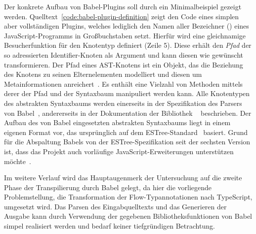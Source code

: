 Der konkrete Aufbau von Babel-Plugins soll durch ein Minimalbeispiel gezeigt werden. Quelltext~\ref{code:babel-plugin-definition} zeigt den Code eines simplen aber vollständigen Plugins, welches lediglich den Namen aller Bezeichner () eines JavaScript-Programms in Großbuchstaben setzt. Hierfür wird eine gleichnamige Besucherfunktion für den Knotentyp  definiert (Zeile 5). Diese erhält den \emph{Pfad} der so adressierten Identifier-Knoten als Argument und kann diesen wie gewünscht transformieren. Der Pfad eines AST-Knotens ist ein Objekt, das die Beziehung des Knotens zu seinen Elternelementen modelliert und diesen um Metainformationen anreichert~\autocite{BABEL:HANDBOOK}. Es enthält eine Vielzahl von Methoden mittels derer der Pfad und der Syntaxbaum manipuliert werden kann.
Alle Knotentypen des abstrakten Syntaxbaums werden einerseits in der Spezifikation des Parsers von Babel~\autocite{BABEL:PARSER_SPEC,BABEL:PARSER}, andererseits in der Dokumentation der Bibliothek ~\autocite{BABEL:TYPES} beschrieben.
Der Aufbau des von Babel eingesetzten abstrakten Syntaxbaums liegt in einem eigenen Format vor, das ursprünglich auf dem ESTree-Standard~\autocite{ESTREE_SPEC} basiert. Grund für die Abspaltung Babels von der ESTree-Spezifikation seit der sechsten Version ist, dass das Projekt auch vorläufige JavaScript-Erweiterungen unterstützen möchte~\autocite{BABEL:STATE_OF_BABEL}.

Im weitere Verlauf wird das Hauptaugenmerk der Untersuchung auf die zweite Phase der Transpilierung durch Babel gelegt, da hier die vorliegende Problemstellung, die Transformation der Flow-Typannotationen nach TypeScript, umgesetzt wird. Das Parsen des Eingabquelltexts und das Generieren der Ausgabe kann durch Verwendung der gegebenen Bibliotheksfunktionen von Babel simpel realisiert werden und bedarf keiner tiefgründigen Betrachtung.
